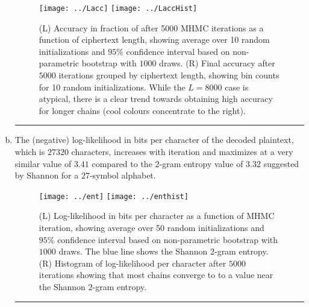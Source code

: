 \documentclass[12pt]{report}
\begin{document}
\begin{enumerate}[a)]
	\begin{figure}[H]
			\centering
			\texttt{[image: ../Lacc]}
			\texttt{[image: ../LaccHist]} 
			\caption{ (L) Accuracy in fraction of after 5000 MHMC iterations as a function of ciphertext length, showing average over 10 random initializations and $95\%$ confidence interval based on non-parametric bootstrap with $1000$ draws. (R) Final accuracy after $5000$ iterations grouped by ciphertext length, showing bin counts for 10 random initializations. While the $L=8000$ case is atypical, there is a clear trend towards obtaining high accuracy for longer chains (cool colours concentrate to the right). \label{Fig:Laccg}}
	\end{figure}
	\hrule
	\newpage
	\item The (negative) log-likelihood in bits per character of the decoded plaintext, which is $27320$ characters, increases with iteration and maximizes at a very similar value of $3.41$ compared to the $2$-gram entropy value of $3.32$ suggested by Shannon\cite{shannon1951prediction} for a $27$-symbol alphabet. 
		\begin{figure}[H]
				\centering
				\texttt{[image: ../ent]}
				\texttt{[image: ../enthist]} 
				\caption{ (L) Log-likelihood in bits per character as a function of MHMC iteration, showing average over 50 random initializations and $95\%$ confidence interval based on non-parametric bootstrap with $1000$ draws. The blue line shows the Shannon $2$-gram entropy\cite{shannon1951prediction}. (R) Histogram of log-likelihood per character after $5000$ iterations showing that most chains converge to to a value near the  Shannon $2$-gram entropy\cite{shannon1951prediction}. \label{Fig:entg}}
		\end{figure}
		\hrule
\end{enumerate}


\begin{singlespace}
	
	
\end{singlespace}
\end{document}
